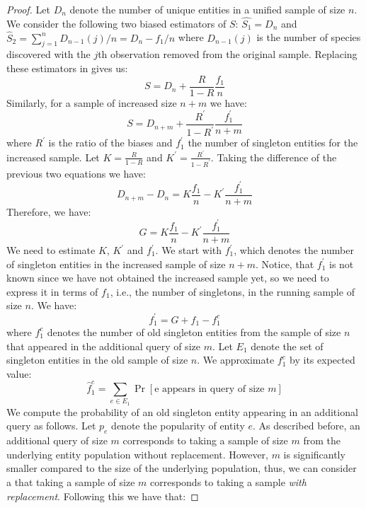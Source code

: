 \documentclass[conference]{IEEEtran}
\begin{document}
\begin{proof}
Let $D_n$ denote the number of unique entities in a unified sample of size $n$. We consider the following two biased estimators of $S$: $\hat{S_1} = D_n$ and $\hat{S}_2 = \sum_{j=1}^n D_{n-1}(j)/n = D_n - f_1/n$ where $D_{n-1}(j)$ is the number of species discovered with the $j$th observation removed from the original sample. Replacing these estimators in  gives us:
\begin{equation}
S = D_n +\frac{R}{1-R}\frac{f_1}{n}
\end{equation}
Similarly, for a sample of increased size $n+m$ we have:
\begin{equation}
S = D_{n+m} +\frac{R^{\prime}}{1-R^{\prime}}\frac{f^{\prime}_1}{n+m}
\end{equation}
where $R^{\prime}$ is the ratio of the biases and $f^{\prime}_1$ the number of singleton entities for the increased sample. Let $K = \frac{R}{1-R}$ and $K^{\prime} = \frac{R^{\prime}}{1-R^{\prime}}$. Taking the difference of the previous two equations we have:
\begin{equation}
D_{n+m} - D_{n} = K\frac{f_1}{n} - K^{\prime}\frac{f^{\prime}_1}{n+m}
\end{equation}
Therefore, we have:
\begin{equation}
\label{eq:new}
G = K\frac{f_1}{n} - K^{\prime}\frac{f^{\prime}_1}{n+m}
\end{equation}
We need to estimate $K$, $K^{\prime}$ and $f^{\prime}_1$. We start with $f^{\prime}_1$, which denotes the number of singleton entities in the increased sample of size $n+m$. Notice, that $f^{\prime}_1$ is not known since we have not obtained the increased sample yet, so we need to express it in terms of $f_1$, i.e., the number of singletons, in the running sample of size $n$. We have:
\begin{equation}
f^{\prime}_1 = G + f_1 - f_1^c
\end{equation}
where $f_1^c$ denotes the number of old singleton entities from the sample of size $n$ that appeared in the additional query of size $m$. Let $E_1$ denote the set of singleton entities in the old sample of size $n$. We approximate $f_1^c$ by its expected value:
\begin{equation}
\hat{f}_1^c = \sum_{e \in E_1} \Pr[\mbox{e appears in query of size $m$}]
\end{equation}
We compute the probability of an old singleton entity appearing in an additional query as follows. Let $p_e$ denote the popularity of entity $e$. As described before, an additional query of size $m$ corresponds to taking a sample of size $m$ from the underlying entity population without replacement. However, $m$ is significantly smaller compared to the size of the underlying population, thus, we can consider a that taking a sample of size $m$ corresponds to taking a sample {\em with replacement}. Following this we have that:

\end{proof}
\end{document}
